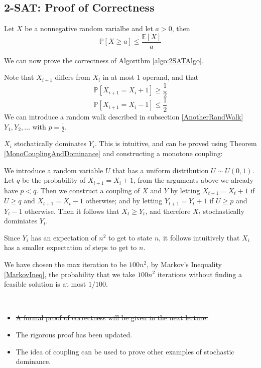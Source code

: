     \subsection{2-SAT: Proof of Correctness}
        \begin{theorem}\label{MarkovIneq}
            Let $X$ be a nonnegative random varialbe and let $a > 0$, then
            \[ \mathbb{P}[X \ge a] \le \frac{\mathbb{E}[X]}{a} \]
        \end{theorem}
        We can now prove the correctness of Algorithm \ref{algo:2SATAlgo}.
        \begin{sketchproof}
            Note that $X_{i+1}$ differs from $X_i$ in at most 1 operand, and that
            \[ \mathbb{P}[X_{i+1} = X_i + 1] \ge \frac{1}{2} \]
            \[ \mathbb{P}[X_{i+1} = X_i - 1] \le \frac{1}{2} \]
            We can introduce a random walk described in subsection \ref{AnotherRandWalk} $Y_1, Y_2, \dots$ with $p = \frac{1}{2}$.

            $X_i$ stochatically dominates $Y_i$. This is intuitive, and can be proved using Theorem \ref{MonoCouplingAndDominance} and constructing a monotone coupling:

            We introduce a random variable $U$ that has a uniform distribution $U \sim U(0,1)$. Let $q$ be the probability of $X_{i+1} = X_i + 1$, from the arguments above we already have $p < q$. Then we construct a coupling of $X$ and $Y$ by letting $X_{t+1} = X_t + 1$ if $U \ge q$ and $X_{t+1} = X_t - 1$ otherwise; and by letting $Y_{t+1} = Y_t + 1$ if $U \ge p$ and $Y_t - 1$ otherwise. Then it follows that $X_t \ge Y_t$, and therefore $X_t$ stochastically dominiates $Y_t$.
            
            Since $Y_i$ has an expectation of $n^2$ to get to state $n$, it follows intuitively that $X_i$ has a smaller expectation of steps to get to $n$.

            We have chosen the max iteration to be $100n^2$, by Markov's Inequality \ref{MarkovIneq}, the probability that we take $100n^2$ iterations without finding a feasible solution is at most $1/100$.
        \end{sketchproof}
        \begin{remark}~{}
            \begin{itemize}
                \item \sout{A formal proof of correctness will be given in the next lecture.}
                \item The rigorous proof has been updated.
                \item The idea of coupling can be used to prove other examples of stochastic dominance.
            \end{itemize}
        \end{remark}

